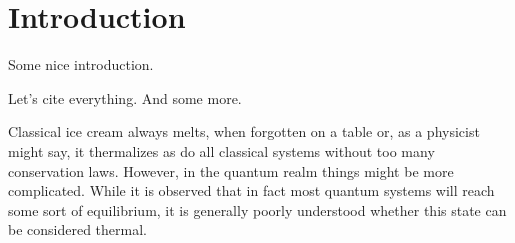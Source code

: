 \chapter{Introduction}\label{ch:introduction}
Some nice introduction.

Let's cite everything\cite{braemerPairLocalizationDipolar2022,eulerMetronomeSpinStabilizes2024,franzEmergentPairLocalization2022,franzObservationUniversalRelaxation2023,geierTimereversalDipolarQuantum2024,braemerClusterTruncatedWigner2024}. And some more\cite{luitzHowSmallQuantum2017,nandkishoreManyBodyLocalized2017}.

Classical ice cream always melts, when forgotten on a table or, as a physicist might say, it thermalizes as do all classical systems without too many conservation laws. However, in the quantum realm things might be more complicated. While it is observed that in fact most quantum systems will reach some sort of equilibrium, it is generally poorly understood whether this state can be considered thermal.  